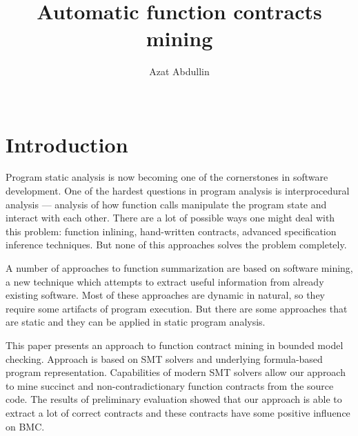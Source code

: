 \documentclass{sig-alternate-05-2015}
\begin{document}
\title{Automatic function contracts mining}

\author{
\alignauthor
Azat Abdullin\\
       \\
}

\maketitle


\section{Introduction}
Program static analysis is now becoming one of the cornerstones in software development. One of the hardest questions in program analysis is interprocedural analysis --- analysis of how function calls manipulate the program state and interact with each other. There are a lot of possible ways one might deal with this problem: function inlining, hand-written contracts, advanced specification inference techniques. But none of this approaches solves the problem completely.

A number of approaches to function summarization are based on software mining, a new technique which attempts to extract useful information from already existing software. Most of these approaches are dynamic in natural, so they require some artifacts of program execution. But there are some approaches that are static and they can be applied in static program analysis.

This paper presents an approach to function contract mining in bounded model checking. Approach is based on SMT solvers and underlying formula-based program representation. Capabilities of modern SMT solvers allow our approach to mine succinct and non-contradictionary function contracts from the source code. The results of preliminary evaluation showed that our approach is able to extract a lot of correct contracts and these contracts have some positive influence on BMC.
\end{document}
